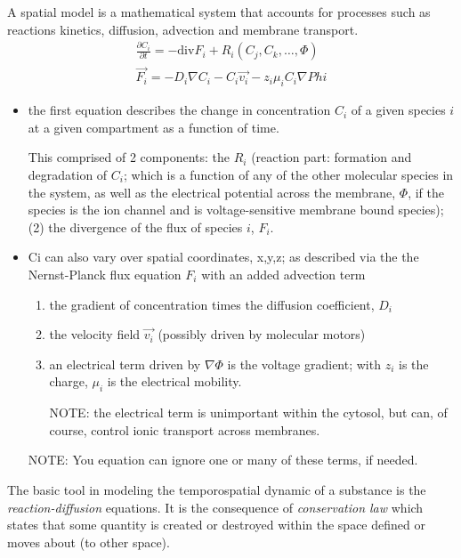 A spatial model is a mathematical system that accounts for processes such as
reactions kinetics, diffusion, advection and membrane transport.
\begin{equation}
\begin{split}
\frac{\partial C_i}{\partial t} = -\text{div}F_i + R_i \left( C_j, C_k,
\ldots, \Phi \right)\\
\vec{F_i} = - D_i \nabla C_i - C_i \vec{v_i} - z_i \mu_i C_i \nabla	Phi
\end{split}
\end{equation}
\begin{itemize}
  \item the first equation describes the change in concentration $C_i$ of a
  given species $i$ at a given compartment as a function of time. 
  
This comprised of 2 components: the $R_i$ (reaction part: formation and
degradation of $C_i$; which is a function of any of the other molecular species
in the system, as well as the electrical potential across the membrane, $\Phi$,
if the species is the ion channel and is voltage-sensitive membrane bound
species); (2) the divergence of the flux of species $i$, $F_i$.

  \item Ci can also vary over spatial coordinates, x,y,z; as described via the 
  the Nernst-Planck flux equation $F_i$ with an added advection term
  \begin{enumerate}
    \item  the gradient of concentration times the diffusion coefficient, $D_i$
  
    \item the velocity field $\vec{v_i}$ (possibly driven by molecular
motors)

    \item an electrical term driven by $\nabla \Phi$ is the voltage gradient;
    with  $z_i$ is the charge, $\mu_i$ is the electrical mobility.

NOTE: the electrical term is unimportant within the cytosol, but can, of course,
control ionic transport across membranes.

  \end{enumerate}

NOTE: You equation can ignore one or many of these terms, if needed.  
  
\end{itemize}

The basic tool in modeling the temporospatial dynamic of a substance
is the {\it reaction-diffusion} equations. It is the consequence of
{\it conservation law} which states that some quantity is created or
destroyed within the space defined or moves about (to other space). 

